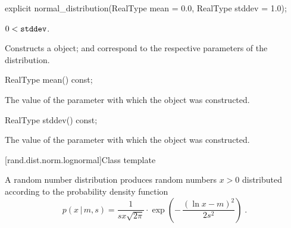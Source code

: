 %
\begin{itemdecl}
explicit normal_distribution(RealType mean = 0.0, RealType stddev = 1.0);
\end{itemdecl}

\begin{itemdescr}
\pnum\requires
 $ 0 < \texttt{stddev} $.

\pnum\effects Constructs a  object;
  and 
 correspond to the respective parameters of the distribution.
\end{itemdescr}

%
%
\begin{itemdecl}
RealType mean() const;
\end{itemdecl}

\begin{itemdescr}
\pnum\returns The value of the  parameter
 with which the object was constructed.
\end{itemdescr}

%
%
\begin{itemdecl}
RealType stddev() const;
\end{itemdecl}

\begin{itemdescr}
\pnum\returns The value of the  parameter
 with which the object was constructed.
\end{itemdescr}


[rand.dist.norm.lognormal]{Class template }%
%

\pnum
A  random number distribution
produces random numbers $ x > 0 $
distributed according to
the probability density function%
%
\[%
 p(x\,|\,m,s)
      = \frac{1}
             {s x \sqrt{2 \pi}}
        \cdot
        \exp{\left(- \, \frac{(\ln{x} - m)^2}
                             {2 s^2}
             \right)
            }
\; \mbox{.}
\]

